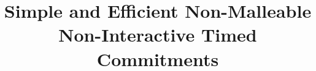 \documentclass{llncs}
\begin{document}
\title{Simple and Efficient Non-Malleable Non-Interactive Timed Commitments}




\maketitle
%


















\begin{appendix}

%


\end{appendix}
\end{document}
